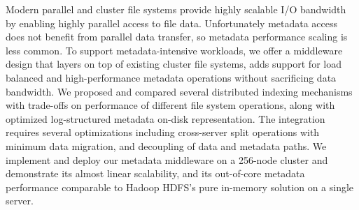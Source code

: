Modern parallel and cluster file systems provide highly scalable I/O bandwidth
by enabling highly parallel access to file data.
Unfortunately metadata access does not benefit from parallel data transfer,
so metadata performance scaling is less common.
To support metadata-intensive workloads,
we offer a middleware design that layers on top of existing cluster
file systems, adds support for load balanced and
high-performance metadata operations without sacrificing data bandwidth.
We proposed and compared several distributed indexing mechanisms
with trade-offs on performance of different file system operations,
along with optimized log-structured metadata on-disk representation.
The integration requires several optimizations including cross-server split
operations with minimum data migration, and decoupling of
data and metadata paths.
We implement and deploy our metadata middleware on a 256-node
cluster and demonstrate its almost linear scalability, and
its out-of-core metadata performance comparable
to Hadoop HDFS's pure in-memory solution on a single server.
